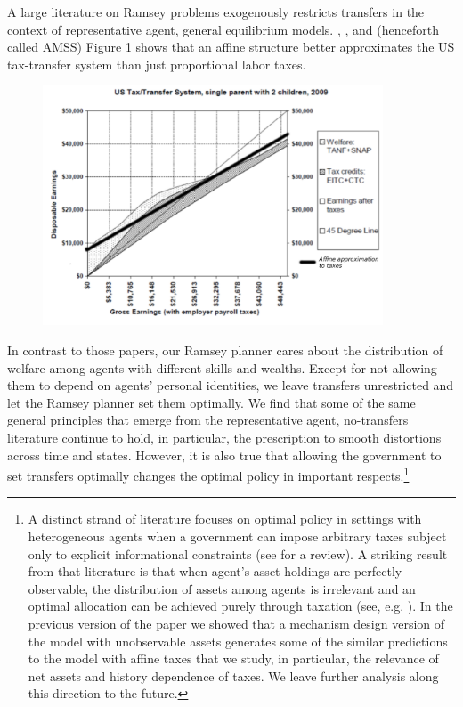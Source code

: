 \documentclass[thmsb,11pt]{article}
\begin{document}
 A large  literature on Ramsey problems  exogenously restricts transfers in the context of representative agent, general equilibrium models.
  \citet{LucasJr.1983}, \citet{Chari1994},  and \citet{Aiyagari2002} (henceforth called  AMSS)
 Figure \ref{fig:affine_taxes} shows that an affine structure better approximates the US tax-transfer system than just proportional labor taxes. {
  \begin{figure}
    \centering
    \includegraphics[width = 0.9\textwidth]{affine_taxes.pdf}
    \label{fig:affine_taxes}
  \end{figure}

}
In contrast to those papers, our Ramsey planner cares about the distribution of welfare among
agents with different skills and wealths. Except for  not allowing them to depend
on agents' personal identities, we leave   transfers unrestricted and let  the Ramsey planner set
them optimally. We find that  some of the same general principles that emerge from the
representative agent, no-transfers literature continue to hold, in particular, the prescription to
smooth distortions across time and states.  However, it is also true that
allowing the government to set transfers optimally changes
the optimal policy in important
respects.\footnote{A distinct strand of literature focuses on  optimal policy in settings with
heterogeneous agents when a government can impose arbitrary taxes subject only
to explicit informational constraints (see \citet{golosov2007new} for a review). A striking result from that literature
is that when  agent's asset holdings are perfectly observable, the distribution of assets among
agents is irrelevant and an optimal allocation can be achieved purely through
taxation (see, e.g. \citet{Bassetto2004}).  In the previous version of the paper we showed that a mechanism design version of the model with unobservable assets generates some of the similar predictions to the model with affine taxes that we study, in particular, the relevance of net assets and history dependence of taxes. We leave further analysis along this
direction to the  future.}
\end{document}

